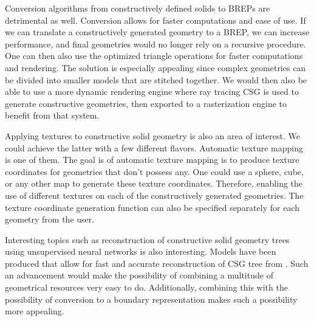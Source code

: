 \documentclass[a4paper,11pt,oneside]{article}
\begin{document}
Conversion algorithms from constructively defined solids to BREPs are detrimental as well. Conversion allows for faster computations and ease of use. If we can translate a constructively generated geometry to a BREP,  we can increase performance, and final geometries would no longer rely on a recursive procedure. One can then also use the optimized triangle operations for faster computations and rendering. The solution is especially appealing since complex geometries can be divided into smaller models that are stitched together. We would then also be able to use a more dynamic rendering engine where ray tracing CSG is used to generate constructive geometries, then exported to a rasterization engine to benefit from that system. 

Applying textures to constructive solid geometry is also an area of interest. We could achieve the latter with a few different flavors. Automatic texture mapping is one of them. The goal is of automatic texture mapping is to produce texture coordinates for geometries that don't possess any. One could use a sphere, cube, or any other map to generate these texture coordinates. Therefore, enabling the use of different textures on each of the constructively generated geometries.	 The texture coordinate generation function can also be specified separately for each geometry from the user.

Interesting topics such as reconstruction of constructive solid geometry trees using unsupervised neural networks is also interesting. Models have been produced that allow for fast and accurate reconstruction of CSG tree from \cite{ucsgnet_ml}. Such an advancement would make the possibility of combining a multitude of geometrical resources very easy to do. Additionally, combining this with the possibility of conversion to a boundary representation makes such a possibility more appealing.  


  

\newpage
%
%
\printbibliography
\end{document}
